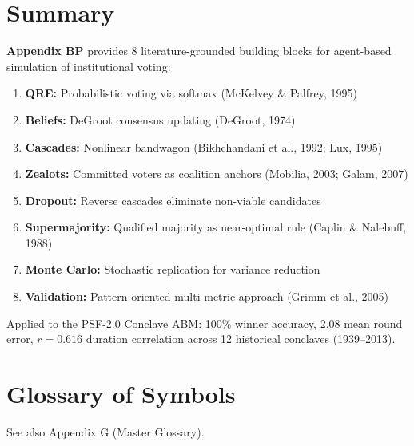\section{Summary}
\label{sec:bp-summary}

\begin{tcolorbox}[colback=green!5!white, colframe=green!75!black, title=Summary]
\textbf{Appendix BP} provides 8 literature-grounded building blocks for
agent-based simulation of institutional voting:

\begin{enumerate}[nosep]
\item \textbf{QRE:} Probabilistic voting via softmax (McKelvey \& Palfrey, 1995)
\item \textbf{Beliefs:} DeGroot consensus updating (DeGroot, 1974)
\item \textbf{Cascades:} Nonlinear bandwagon (Bikhchandani et al., 1992; Lux, 1995)
\item \textbf{Zealots:} Committed voters as coalition anchors (Mobilia, 2003; Galam, 2007)
\item \textbf{Dropout:} Reverse cascades eliminate non-viable candidates
\item \textbf{Supermajority:} Qualified majority as near-optimal rule (Caplin \& Nalebuff, 1988)
\item \textbf{Monte Carlo:} Stochastic replication for variance reduction
\item \textbf{Validation:} Pattern-oriented multi-metric approach (Grimm et al., 2005)
\end{enumerate}

Applied to the PSF-2.0 Conclave ABM: 100\% winner accuracy, 2.08 mean round error,
$r = 0.616$ duration correlation across 12 historical conclaves (1939--2013).
\end{tcolorbox}


\section{Glossary of Symbols}
\label{sec:bp-glossary}

See also Appendix G (Master Glossary).

